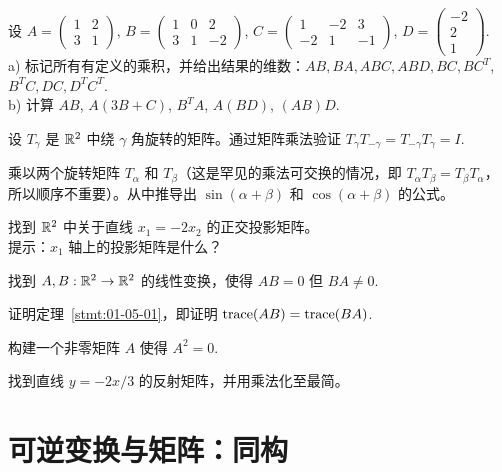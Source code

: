 \begin{problemset}
\item \label{ex:01-05-01} 设 $A = \begin{pmatrix} 1 & 2 \\ 3 & 1 \end{pmatrix}$, $B = \begin{pmatrix} 1 & 0 & 2 \\ 3 & 1 & -2 \end{pmatrix}$, $C = \begin{pmatrix} 1 & -2 & 3 \\ -2 & 1 & -1 \end{pmatrix}$, $D = \begin{pmatrix} -2 \\ 2 \\ 1 \end{pmatrix}.$
\\
a) 标记所有有定义的乘积，并给出结果的维数：$AB, BA, ABC, ABD, BC, BC^T$, $B^T C, DC, D^T C^T$.
\\
b) 计算 $AB$, $A(3B + C)$, $B^T A$, $A(BD)$, $(AB)D$.
\item \label{ex:01-05-02} 设 $T_\gamma$ 是 $\mathbb{R}^2$ 中绕 $\gamma$ 角旋转的矩阵。通过矩阵乘法验证 $T_\gamma T_{-\gamma} = T_{-\gamma} T_\gamma = I$.~
\item \label{ex:01-05-03} 乘以两个旋转矩阵 $T_\alpha$ 和 $T_\beta$（这是罕见的乘法可交换的情况，即 $T_\alpha T_\beta = T_\beta T_\alpha$，所以顺序不重要）。从中推导出 $\sin(\alpha + \beta)$ 和 $\cos(\alpha + \beta)$ 的公式。
\item \label{ex:01-05-04} 找到 $\mathbb{R}^2$ 中关于直线 $x_1 = -2x_2$ 的正交投影矩阵。
\\
{\heiti 提示}：$x_1$ 轴上的投影矩阵是什么？
\item \label{ex:01-05-05} 找到 $A, B: \mathbb{R}^2 \to \mathbb{R}^2$ 的线性变换，使得 $AB = 0$ 但 $BA \neq 0$.~
\item \label{ex:01-05-06} 证明定理~\ref{stmt:01-05-01}，即证明 $\operatorname{trace}(AB) = \operatorname{trace}(BA)$.~
\item \label{ex:01-05-07} 构建一个非零矩阵 $A$ 使得 $A^2 = 0$.~
\item \label{ex:01-05-08} 找到直线 $y = -2x/3$ 的反射矩阵，并用乘法化至最简。

\end{problemset}

\section{可逆变换与矩阵：同构}\label{sec:01-06}

